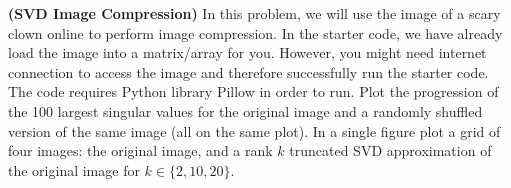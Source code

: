 \documentclass[12pt,letterpaper,fleqn]{hmcpset}
\begin{document}
\begin{problem}[2]
\textbf{(SVD Image Compression)}
In this problem, we will use the image of a scary clown online to perform image compression.  In the starter code, we have already load the image into a matrix/array for you. However, you might need internet connection to access the image and therefore successfully run the starter code. The code requires Python library Pillow in order to run.
\newline
\newline 
Plot the progression of the 100 largest singular values for the original image
and a randomly shuffled version of the same image (all on the same plot). In a single figure plot
a grid of four images: the original image, and a rank $k$ truncated SVD approximation of the original
image for $k\in\{2,10,20\}$.

\end{problem}
\begin{solution}
\vfill
\end{solution}
\newpage
\end{document}
